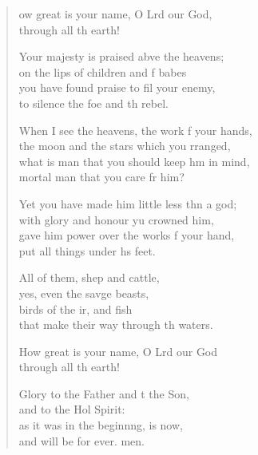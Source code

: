 \begin{verse}
  \begin{patverse}

ow great is your name, O Lrd our God,\Med\\
through all th earth!

Your majesty is praised abve the heavens;\Med\\
on the lips of children and f babes\\
you have found praise to fil your enemy,\Med\\
to silence the foe and th rebel.

When I see the heavens, the work f your hands,\Med\\
the moon and the stars which you rranged,\\
what is man that you should keep h\pointup{\i}m in mind,\Med\\
mortal man that you care fr him?

Yet you have made him little less thn a god;\Med\\
with glory and honour yu crowned him,\\
gave him power over the works f your hand,\Med\\
put all things under h\pointup{\i}s feet.

All of them, shep and cattle,\Med\\
yes, even the savge beasts,\\
birds of the ir, and fish\Med\\
that make their way through th waters.

How great is your name, O Lrd our God\\
through all th earth!

Glory to the Father and t the Son,\Med\\
and to the Hol Spirit:\\
as it was in the beginn\pointup{\i}ng, is now,\Med\\
and will be for ever. men.
  \end{patverse}
  \end{verse}
